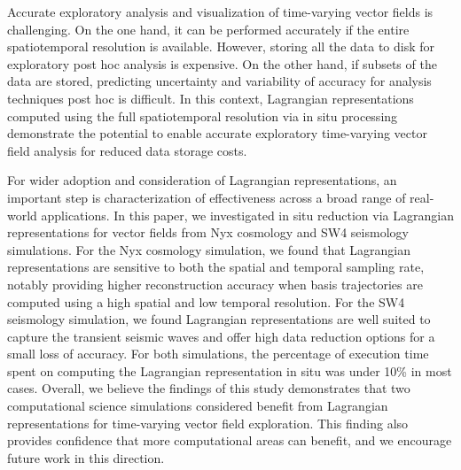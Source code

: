 Accurate exploratory analysis and visualization of time-varying vector fields is challenging.
%
On the one hand, it can be performed accurately if the entire spatiotemporal resolution is available.
%
However, storing all the data to disk for exploratory post hoc analysis is expensive.
%
On the other hand, if subsets of the data are stored, predicting uncertainty and variability of accuracy for analysis techniques post hoc is difficult.
%
In this context, Lagrangian representations computed using the full spatiotemporal resolution via in situ processing demonstrate the potential to enable accurate exploratory time-varying vector field analysis for reduced data storage costs.



For wider adoption and consideration of Lagrangian representations, an important step is characterization of effectiveness across a broad range of real-world applications.
%
In this paper, we investigated in situ reduction via Lagrangian representations for vector fields from Nyx cosmology and SW4 seismology simulations.
%
For the Nyx cosmology simulation, we found that Lagrangian representations are sensitive to both the spatial and temporal sampling rate, notably providing higher reconstruction accuracy when basis trajectories are computed using a high spatial and low temporal resolution.
%
For the SW4 seismology simulation, we found Lagrangian representations are well suited to capture the transient seismic waves and offer high data reduction options for a small loss of accuracy.
%
For both simulations, the percentage of execution time spent on computing the Lagrangian representation in situ was under 10\% in most cases.
%
%
Overall, we believe the findings of this study demonstrates that two computational science simulations considered benefit from Lagrangian representations for time-varying vector field exploration.
%
This finding also provides confidence that more computational areas can benefit, and we encourage future work in this direction.
